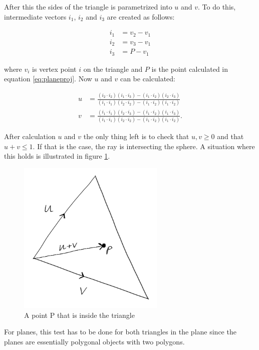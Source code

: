 \documentclass[a4paper]{report}
\begin{document}
After this the sides of the triangle is parametrized into \(u\) and
\(v\). To do this, intermediate vectors \(i_1\), \(i_2\) and \(i_3\)
are created as follows:

\begin{align}
  i_1 &= v_2 - v_1 \nonumber \\
  i_2 &= v_3 - v_1 \nonumber \\
  i_3 &= P - v_1
  \label{eq:intermediate}
\end{align}

where \(v_i\) is vertex point \(i\) on the triangle and \(P\) is the point calculated
in equation \ref{eq:planeproj}. Now \(u\) and \(v\) can be calculated:

\begin{align}
  u &= \frac{(i_2 \cdot i_2)(i_1 \cdot i_3) - (i_1 \cdot i_2)(i_2
    \cdot i_3)}{(i_1 \cdot i_1)(i_2 \cdot i_2) - (i_1 \cdot i_2)(i_1
    \cdot i_2)} \nonumber \\
  v &= \frac{(i_1 \cdot i_1)(i_2 \cdot i_3) - (i_1 \cdot i_2)(i_1
    \cdot i_3)}{(i_1 \cdot i_1)(i_2 \cdot i_2) - (i_1 \cdot i_2)(i_1
    \cdot i_2)}.
  \label{eq:uandv}
\end{align}

After calculation \(u\) and \(v\) the only thing left is to check that
\(u,v \geq 0\) and that \(u+v \leq 1\). If that is the case, the ray
is intersecting the sphere. A situation where this holds is
illustrated in figure \ref{fig:pointintriangle}.

\begin{figure}
  \centering
  \includegraphics[width=7cm]{figures/3}
  \caption{A point P that is inside the triangle}
  \label{fig:pointintriangle}
\end{figure}

For planes, this test has to be done for both triangles in the plane
since the planes are essentially polygonal objects with two polygons.
\end{document}

